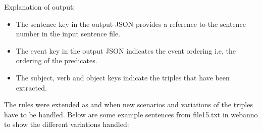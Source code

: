 \documentclass[11pt,letterpaper]{article}
\begin{document}
\noindent \newline
Explanation of output:
\begin{itemize}
    \item The sentence key in the output JSON provides a reference to the sentence number in the input sentence file.
    
    \item The event key in the output JSON indicates the event ordering i.e, the ordering of the predicates.
    
    \item The subject, verb and object keys indicate the triples that have been extracted.
\end{itemize}
The rules were extended as and when new scenarios and variations of the triples have to be handled.
Below are some example sentences from file15.txt in webanno to show the different variations handled:
\end{document}
